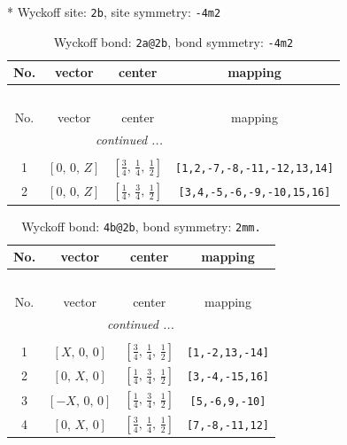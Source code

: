 \documentclass[fleqn,8pt]{jsarticle}
\begin{document}
* Wyckoff site: {\tt 2b}, site symmetry: {\tt -4m2}
\renewcommand{\arraystretch}{1.2}
\begin{longtable}{cccc}
\caption{Wyckoff bond: {\tt 2a@2b}, bond symmetry: {\tt -4m2}}
 \\
 \hline \hline
No. & vector & center & mapping \\ \hline \endfirsthead

\multicolumn{3}{l}{\tablename\ \thetable{}} \\
 \hline \hline
No. & vector & center & mapping \\ \hline \endhead

 \hline \hline
\multicolumn{3}{r}{\footnotesize\it continued ...} \\ \endfoot

 \hline \hline
\multicolumn{3}{r}{} \\ \endlastfoot

1 & $\left[ 0,\, 0,\, Z \right]$ & $\left[ \frac{3}{4},\, \frac{1}{4},\, \frac{1}{2} \right]$ & {\tt [1,2,-7,-8,-11,-12,13,14]} \\ \hline
2 & $\left[ 0,\, 0,\, Z \right]$ & $\left[ \frac{1}{4},\, \frac{3}{4},\, \frac{1}{2} \right]$ & {\tt [3,4,-5,-6,-9,-10,15,16]} \\
\end{longtable}
\renewcommand{\arraystretch}{1.2}
\begin{longtable}{cccc}
\caption{Wyckoff bond: {\tt 4b@2b}, bond symmetry: {\tt 2mm.}}
 \\
 \hline \hline
No. & vector & center & mapping \\ \hline \endfirsthead

\multicolumn{3}{l}{\tablename\ \thetable{}} \\
 \hline \hline
No. & vector & center & mapping \\ \hline \endhead

 \hline \hline
\multicolumn{3}{r}{\footnotesize\it continued ...} \\ \endfoot

 \hline \hline
\multicolumn{3}{r}{} \\ \endlastfoot

1 & $\left[ X,\, 0,\, 0 \right]$ & $\left[ \frac{3}{4},\, \frac{1}{4},\, \frac{1}{2} \right]$ & {\tt [1,-2,13,-14]} \\ \hline
2 & $\left[ 0,\, X,\, 0 \right]$ & $\left[ \frac{1}{4},\, \frac{3}{4},\, \frac{1}{2} \right]$ & {\tt [3,-4,-15,16]} \\ \hline
3 & $\left[ - X,\, 0,\, 0 \right]$ & $\left[ \frac{1}{4},\, \frac{3}{4},\, \frac{1}{2} \right]$ & {\tt [5,-6,9,-10]} \\ \hline
4 & $\left[ 0,\, X,\, 0 \right]$ & $\left[ \frac{3}{4},\, \frac{1}{4},\, \frac{1}{2} \right]$ & {\tt [7,-8,-11,12]} \\
\end{longtable}
\end{document}
